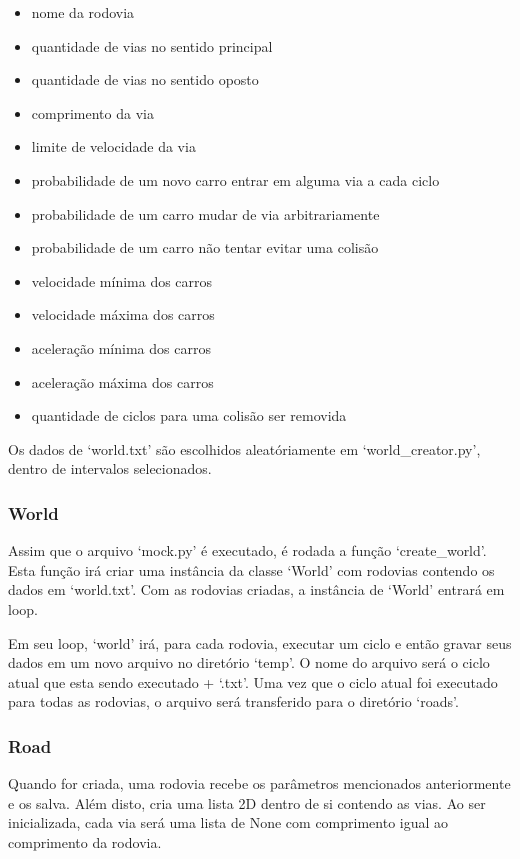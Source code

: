 \documentclass{article}
\begin{document}
    \begin{itemize}
    \item nome da rodovia
    \item quantidade de vias no sentido principal
    \item quantidade de vias no sentido oposto
    \item comprimento da via
    \item limite de velocidade da via
    \item probabilidade de um novo carro entrar em alguma via a cada ciclo
    \item probabilidade de um carro mudar de via arbitrariamente
    \item probabilidade de um carro não tentar evitar uma colisão
    \item velocidade mínima dos carros
    \item velocidade máxima dos carros
    \item aceleração mínima dos carros
    \item aceleração máxima dos carros
    \item quantidade de ciclos para uma colisão ser removida
    \end{itemize}
    Os dados de `world.txt' são escolhidos aleatóriamente em `world\_creator.py', dentro de intervalos selecionados.

    \subsubsection*{World}
    Assim que o arquivo `mock.py' é executado, é rodada a função `create\_world'. Esta função irá criar uma instância
    da classe `World' com rodovias contendo os dados em `world.txt'. Com as rodovias criadas, a instância de `World'
    entrará em loop.

    Em seu loop, `world' irá, para cada rodovia, executar um ciclo e então gravar seus dados em um novo arquivo no
    diretório `temp'. O nome do arquivo será o ciclo atual que esta sendo executado + `.txt'. Uma vez que o ciclo
    atual foi executado para todas as rodovias, o arquivo será transferido para o diretório `roads'.


    \subsubsection*{Road}
    Quando for criada, uma rodovia recebe os parâmetros mencionados anteriormente e os salva. Além disto, cria
    uma lista 2D dentro de si contendo as vias. Ao ser inicializada, cada via será uma lista de None com comprimento
    igual ao comprimento da rodovia.
\end{document}
